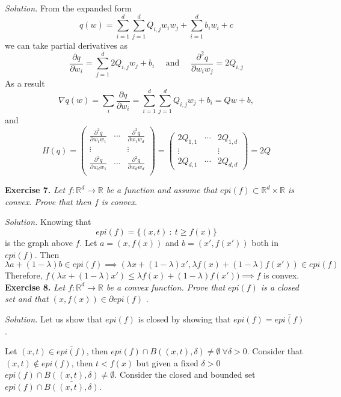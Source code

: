 \documentclass[11pt]{article}
\begin{document}
\emph{Solution. } 
From the expanded form
\[
  q(w) = \sum_{i=1}^{d}\sum_{j=1}^d Q_{i,j} w_iw_j + \sum_{i=1}^db_i w_i + c
\]
we can take partial derivatives as
\[
    \frac{\partial q}{\partial w_i} = \sum_{j=1}^d 2Q_{i,j}w_j +  b_i \quad \text{ and } \quad \frac{\partial ^2 q}{\partial w_i w_j} = 2Q_{i,j}
\]
As a result
\[
     \nabla q(w) = \sum_i  \frac{\partial q}{\partial w_i} = \sum_{i=1}^d \sum_{j=1}^d Q_{i,j}w_j + b_i = Qw + b,
\]
and 
\[
     H(q) = 
     \begin{pmatrix}  
        \frac{\partial ^2 q}{\partial w_1 w_1} & \cdots & \frac{\partial ^2 q}{\partial w_1 w_d} \\
        \vdots & & \vdots \\
        \frac{\partial ^2 q}{\partial w_d w_1} & \cdots & \frac{\partial ^2 q}{\partial w_d w_d} \\
     \end{pmatrix} = \begin{pmatrix}
         2Q_{1,1} & \cdots & 2Q_{1,d}\\
         \vdots & & \vdots \\
         2Q_{d,1} & \cdots & 2Q_{d,d}
     \end{pmatrix} = 2Q
\]

\textbf{Exercise 7. }\emph{Let \( f:\mathbb{R}^d \to \mathbb{R} \)  be a function and assume that \( epi(f) \subset \mathbb{R}^d \times \mathbb{R} \)  is convex. Prove that then \( f \)  is convex}.

\emph{Solution. }Knowing that
\[
     epi(f) = \{(x,t) \ : \ t \geq f(x)\}
\]
is the graph above \( f \). Let \( a = (x, f(x)) \) and \( b = (x', f(x')) \) both in \( epi(f) \). Then 
\[
     \lambda a + (1-\lambda)b \in epi(f) \implies (\lambda x + (1-\lambda)x', \lambda f(x) + (1-\lambda)f(x')) \in epi(f)
\]
Therefore, \( f(\lambda x + (1-\lambda)x') \leq \lambda f(x) + (1-\lambda)f(x')) \implies f\) is convex.\\


\textbf{Exercise 8. }\emph{ Let \( f : \mathbb{R}^d \to \mathbb{R} \)  be a convex function. Prove that \( epi(f) \)  is a closed set and that \( (x, f(x)) \in \partial epi(f) \)  }.

\emph{Solution. } Let us show that \( epi(f) \) is closed by showing that \( epi(f) = \bar{epi(f)} \) . 

Let \( (x,t) \in \bar{ epi(f)} \), then \( epi(f) \cap B((x,t), \delta) \neq \emptyset \ \forall \delta > 0 \). Consider that \( (x,t) \notin epi(f) \), then \( t < f(x) \) but given a fixed \( \delta > 0 \)  \(  epi(f) \cap B((x,t), \delta) \neq \emptyset \). Consider the closed and bounded set  \( epi(f) \cap \bar{B((x,t), \delta)} \).
\end{document}

